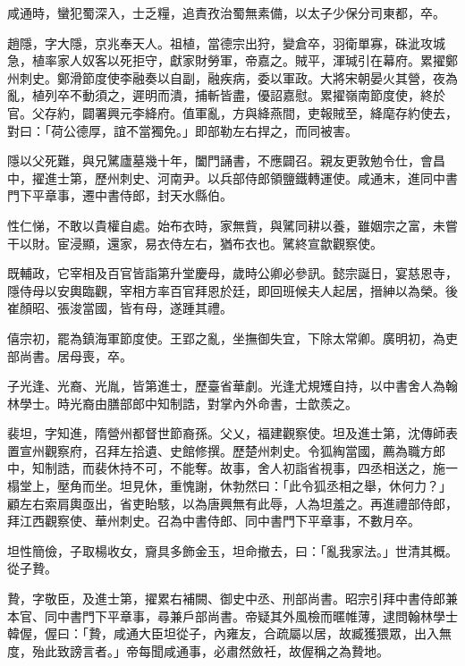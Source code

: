 \begin{pinyinscope}
 咸通時，蠻犯蜀深入，士乏糧，追責孜治蜀無素備，以太子少保分司東都，卒。



 趙隱，字大隱，京兆奉天人。祖植，當德宗出狩，變倉卒，羽衛單寡，硃泚攻城急，植率家人奴客以死拒守，獻家財勞軍，帝嘉之。賊平，渾瑊引在幕府。累擢鄭州刺史。鄭滑節度使李融奏以自副，融疾病，委以軍政。大將宋朝晏火其營，夜為亂，植列卒不動須之，遲明而潰，捕斬皆盡，優詔嘉慰。累擢嶺南節度使，終於官。父存約，闢署興元李絳府。值軍亂，方與絳燕間，吏報賊至，絳麾存約使去，對曰：「荷公德厚，誼不當獨免。」即部勒左右捍之，而同被害。



 隱以父死難，與兄騭廬墓幾十年，闔門誦書，不應闢召。親友更敦勉令仕，會昌中，擢進士第，歷州刺史、河南尹。以兵部侍郎領鹽鐵轉運使。咸通末，進同中書門下平章事，遷中書侍郎，封天水縣伯。



 性仁悌，不敢以貴權自處。始布衣時，家無貲，與騭同耕以養，雖姻宗之富，未嘗干以財。宦浸顯，還家，易衣侍左右，猶布衣也。騭終宣歙觀察使。



 既輔政，它宰相及百官皆詣第升堂慶母，歲時公卿必參訊。懿宗誕日，宴慈恩寺，隱侍母以安輿臨觀，宰相方率百官拜恩於廷，即回班候夫人起居，搢紳以為榮。後崔顏昭、張浚當國，皆有母，遂踵其禮。



 僖宗初，罷為鎮海軍節度使。王郢之亂，坐撫御失宜，下除太常卿。廣明初，為吏部尚書。居母喪，卒。



 子光逢、光裔、光胤，皆第進士，歷臺省華劇。光逢尤規矱自持，以中書舍人為翰林學士。時光裔由膳部郎中知制誥，對掌內外命書，士歆羨之。



 裴坦，字知進，隋營州都督世節裔孫。父乂，福建觀察使。坦及進士第，沈傳師表置宣州觀察府，召拜左拾遺、史館修撰。歷楚州刺史。令狐綯當國，薦為職方郎中，知制誥，而裴休持不可，不能奪。故事，舍人初詣省視事，四丞相送之，施一榻堂上，壓角而坐。坦見休，重愧謝，休勃然曰：「此令狐丞相之舉，休何力？」顧左右索肩輿亟出，省吏眙駭，以為唐興無有此辱，人為坦羞之。再進禮部侍郎，拜江西觀察使、華州刺史。召為中書侍郎、同中書門下平章事，不數月卒。



 坦性簡儉，子取楊收女，齎具多飾金玉，坦命撤去，曰：「亂我家法。」世清其概。從子贄。



 贄，字敬臣，及進士第，擢累右補闕、御史中丞、刑部尚書。昭宗引拜中書侍郎兼本官、同中書門下平章事，尋兼戶部尚書。帝疑其外風檢而暱帷薄，逮問翰林學士韓偓，偓曰：「贄，咸通大臣坦從子，內雍友，合疏屬以居，故臧獲猥眾，出入無度，殆此致謗言者。」帝每聞咸通事，必肅然斂衽，故偓稱之為贄地。




\end{pinyinscope}
